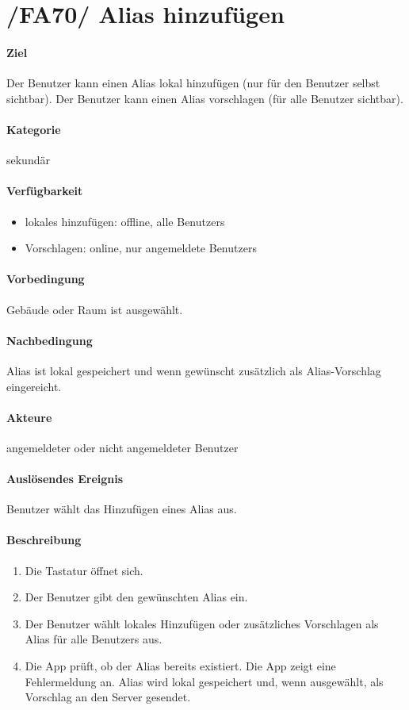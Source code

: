 \section[Alias hinzufügen]{/FA70/ Alias hinzufügen}
\label{/FA70/}
\paragraph{Ziel}
Der \Gls{Benutzer} kann einen \Gls{Alias} \gls{lokal} hinzufügen (nur für den \Gls{Benutzer} selbst sichtbar). Der \Gls{Benutzer} kann einen \Gls{Alias} vorschlagen (für alle \Gls{Benutzer} sichtbar).
\paragraph{Kategorie}
sekundär
\paragraph{Verfügbarkeit}
\begin{itemize}
    \item \Gls{lokal}es hinzufügen: offline, alle \Glspl{Benutzer}
    \item Vorschlagen: online, nur angemeldete \Glspl{Benutzer}
\end{itemize}

\paragraph{Vorbedingung}
Gebäude oder Raum ist ausgewählt.
\paragraph{Nachbedingung}
\Gls{Alias} ist \gls{lokal} gespeichert und wenn gewünscht zusätzlich als \Gls{Alias-Vorschlag} eingereicht.
\paragraph{Akteure}
angemeldeter oder nicht angemeldeter \Gls{Benutzer}
\paragraph{Auslösendes Ereignis}
\Gls{Benutzer} wählt das Hinzufügen eines \Gls{Alias} aus.
\paragraph{Beschreibung}
\begin{enumerate}
    \item Die Tastatur öffnet sich.
    \item Der \Gls{Benutzer} gibt den gewünschten \Gls{Alias} ein.
    \item Der \Gls{Benutzer} wählt \gls{lokal}es Hinzufügen oder zusätzliches Vorschlagen als \Gls{Alias} für alle \Glspl{Benutzer} aus.
    \item Die App prüft, ob der \Gls{Alias} bereits existiert.
     Die App zeigt eine Fehlermeldung an.
     \Gls{Alias} wird \gls{lokal} gespeichert und, wenn ausgewählt, als Vorschlag an den \Gls{Server} gesendet.
\end{enumerate}
